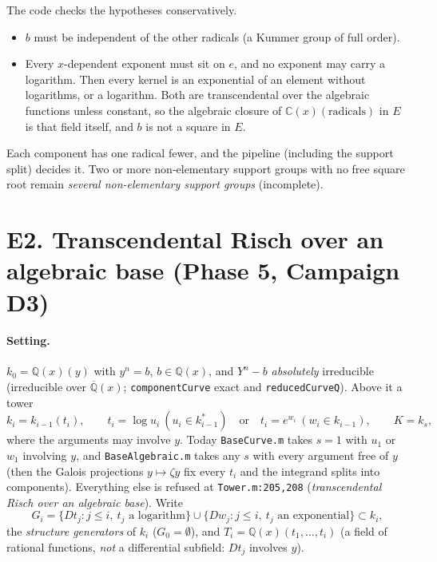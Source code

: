 \documentclass[11pt]{article}
\theoremstyle{definition}
\theoremstyle{remark}
\newcommand{\Q}{\mathbb{Q}}
\newcommand{\Z}{\mathbb{Z}}
\newcommand{\C}{\mathbb{C}}
\newcommand{\Qbar}{\overline{\mathbb{Q}}}
\newcommand{\lc}{\operatorname{lc}}
\newcommand{\code}[1]{\texttt{#1}}
\begin{document}
The code checks the hypotheses conservatively.
\begin{itemize}
\item $b$ must be independent of the other radicals (a Kummer group of full order).
\item Every $x$-dependent exponent must sit on $e$, and no exponent may carry a
  logarithm. Then every kernel is an exponential of an element without logarithms, or a
  logarithm. Both are transcendental over the algebraic functions unless constant, so
  the algebraic closure of $\C(x)(\text{radicals})$ in $E$ is that field itself, and $b$
  is not a square in $E$.
\end{itemize}
Each component has one radical fewer, and the pipeline (including the support split)
decides it. Two or more non-elementary support groups with no free square root remain
\emph{several non-elementary support groups} (incomplete).


\section*{E2. Transcendental Risch over an algebraic base (Phase 5, Campaign D3)}
\label{sec:E2}

\paragraph{Setting.} $k_0=\Q(x)(y)$ with $y^n=b$, $b\in\Q(x)$, and $Y^n-b$
\emph{absolutely} irreducible (irreducible over $\Qbar(x)$; \code{componentCurve} exact
and \code{reducedCurveQ}). Above it a tower
\[ k_i=k_{i-1}(t_i),\qquad t_i=\log u_i\ (u_i\in k_{i-1}^*)\quad\text{or}\quad
   t_i=e^{w_i}\ (w_i\in k_{i-1}),\qquad K=k_s, \]
where the arguments may involve $y$. Today \code{BaseCurve.m} takes $s=1$ with $u_1$ or
$w_1$ involving $y$, and \code{BaseAlgebraic.m} takes any $s$ with every argument free of
$y$ (then the Galois projections $y\mapsto\zeta y$ fix every $t_i$ and the integrand
splits into components). Everything else is refused at \code{Tower.m:205,208}
(\emph{transcendental Risch over an algebraic base}). Write
\[ G_i=\{Dt_j: j\le i,\ t_j\text{ a logarithm}\}\cup\{Dw_j: j\le i,\ t_j\text{ an exponential}\}
   \subset k_i ,\]
the \emph{structure generators} of $k_i$ ($G_0=\emptyset$), and $T_i=\Q(x)(t_1,\dots,t_i)$
(a field of rational functions, \emph{not} a differential subfield: $Dt_j$ involves $y$).
\end{document}
